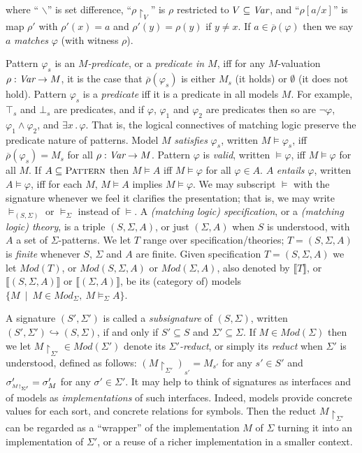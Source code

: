 \documentclass[UTF8,11pt]{article}
\theoremstyle{plain}
\theoremstyle{definition}
\theoremstyle{remark}
\newcommand{\Mod}{\textit{Mod}}
\newcommand{\denote}[1]{\llbracket{#1}\rrbracket}
\newcommand{\reduct}[2]{\mbox{${#1}\!\!\upharpoonright_{#2}$}}
\newcommand{\reductscript}[2]{\mbox{\tiny${#1}\!\!\upharpoonright_{#2}$}}
\newcommand{\Pattern}{\textsc{Pattern}\xspace}
\begin{document}
where `` $\backslash$'' is set difference,
``$\rho\!\!\upharpoonright_V$'' is
$\rho$ restricted to $V \subseteq \textit{Var}$,
and ``$\rho[a/x]$'' is map $\rho'$ with $\rho'(x)=a$ and $\rho'(y)=\rho(y)$ if
$y\neq x$.
If $a\in \overline{\rho}(\varphi)$ then we say $a$ \emph{matches}
$\varphi$ (with witness $\rho$).

Pattern $\varphi_s$ is an \emph{$M$-predicate}, or a
\emph{predicate in $M$}, iff for any $M$-valuation $\rho:\textit{Var}\rightarrow M$,
it is the case that $\overline{\rho}(\varphi_s)$ is either $M_s$ (it holds) or
$\emptyset$ (it does not hold).
Pattern $\varphi_s$ is a \emph{predicate} iff it is a predicate in all
models $M$.
For example, $\top_s$ and $\bot_s$ are predicates, and if $\varphi$,
$\varphi_1$ and $\varphi_2$ are predicates then so are $\neg\varphi$,
$\varphi_1 \wedge \varphi_2$, and $\exists x\,.\,\varphi$.
That is, the logical connectives of matching logic preserve the predicate
nature of patterns.
Model $M$ \emph{satisfies} $\varphi_s$, written ${M}\models \varphi_s$, iff
$\overline{\rho}(\varphi_s) = M_s$ for all $\rho:\textit{Var}\rightarrow M$.
Pattern $\varphi$ is \emph{valid}, written $\models \varphi$,
iff ${M} \models \varphi$ for all ${M}$.
If $A\subseteq\Pattern$ then ${M} \models A$ iff
${M} \models \varphi$ for all $\varphi\in A$.
$A$ \emph{entails} $\varphi$, written $A \models \varphi$,
iff for each ${M}$, ${M} \models A$ implies ${M} \models \varphi$.
We may subscript $\models$ with the signature whenever we feel it
clarifies the presentation; that is, we may write $\models_{(S,\Sigma)}$ or
$\models_\Sigma$ instead of $\models$.
A \emph{(matching logic) specification}, or a \emph{(matching logic) theory},
is a triple $(S,\Sigma,A)$, or just $(\Sigma,A)$ when $S$ is understood,
with $A$ a set of $\Sigma$-patterns.
We let $T$ range over specification/theories;
$T = (S,\Sigma,A)$ is \emph{finite} whenever $S$, $\Sigma$ and $A$ are finite.
Given specification $T=(S,\Sigma,A)$ we let $\Mod(T)$, or
$\Mod(S,\Sigma,A)$ or $\Mod(\Sigma,A)$, also denoted by $\denote{T}$,
or $\denote{(S,\Sigma,A)}$ or $\denote{(\Sigma,A)}$, be its (category of)
models $\{M \ \mid \ M \in \Mod_{\Sigma},\ M \models_{\Sigma} A \}$.

A signature $(S',\Sigma')$ is called a \emph{subsignature} of $(S,\Sigma)$, written
$(S',\Sigma') \hookrightarrow(S,\Sigma)$, if and only if $S' \subseteq S$ and
$\Sigma' \subseteq \Sigma$.
If $M \in \Mod(\Sigma)$ then we let
$\reduct{M}{\Sigma'} \in \Mod(\Sigma')$ denote its
\emph{$\Sigma'$-reduct}, or simply its \emph{reduct} when
$\Sigma'$ is understood, defined as follows:
$(\reduct{M}{\Sigma'})_{s'} = M_{s'}$ for any $s'\in S'$ and
$\sigma'_{\reductscript{M}{\Sigma'}} = \sigma'_M$ for any $\sigma'\in\Sigma'$.
It may help to think of signatures as interfaces and of models as
\emph{implementations} of such interfaces.
Indeed, models provide concrete values for each sort, and concrete relations
for symbols.
Then the reduct $\reduct{M}{\Sigma'}$ can be regarded as a ``wrapper'' of
the implementation $M$ of $\Sigma$ turning it into an implementation of
$\Sigma'$, or a reuse of a richer implementation in a smaller context.
\end{document}
